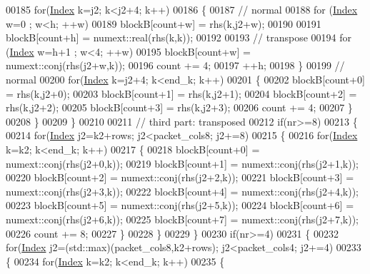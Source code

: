 \begin{DoxyCode}
00185         \textcolor{keywordflow}{for}(\hyperlink{namespace_eigen_a62e77e0933482dafde8fe197d9a2cfde}{Index} k=j2; k<j2+4; k++)
00186         \{
00187           \textcolor{comment}{// normal}
00188           \textcolor{keywordflow}{for} (\hyperlink{namespace_eigen_a62e77e0933482dafde8fe197d9a2cfde}{Index} w=0 ; w<h; ++w)
00189             blockB[count+w] = rhs(k,j2+w);
00190 
00191           blockB[count+h] = numext::real(rhs(k,k));
00192 
00193           \textcolor{comment}{// transpose}
00194           \textcolor{keywordflow}{for} (\hyperlink{namespace_eigen_a62e77e0933482dafde8fe197d9a2cfde}{Index} w=h+1 ; w<4; ++w)
00195             blockB[count+w] = numext::conj(rhs(j2+w,k));
00196           count += 4;
00197           ++h;
00198         \}
00199         \textcolor{comment}{// normal}
00200         \textcolor{keywordflow}{for}(\hyperlink{namespace_eigen_a62e77e0933482dafde8fe197d9a2cfde}{Index} k=j2+4; k<end\_k; k++)
00201         \{
00202           blockB[count+0] = rhs(k,j2+0);
00203           blockB[count+1] = rhs(k,j2+1);
00204           blockB[count+2] = rhs(k,j2+2);
00205           blockB[count+3] = rhs(k,j2+3);
00206           count += 4;
00207         \}
00208       \}
00209     \}
00210 
00211     \textcolor{comment}{// third part: transposed}
00212     \textcolor{keywordflow}{if}(nr>=8)
00213     \{
00214       \textcolor{keywordflow}{for}(\hyperlink{namespace_eigen_a62e77e0933482dafde8fe197d9a2cfde}{Index} j2=k2+rows; j2<packet\_cols8; j2+=8)
00215       \{
00216         \textcolor{keywordflow}{for}(\hyperlink{namespace_eigen_a62e77e0933482dafde8fe197d9a2cfde}{Index} k=k2; k<end\_k; k++)
00217         \{
00218           blockB[count+0] = numext::conj(rhs(j2+0,k));
00219           blockB[count+1] = numext::conj(rhs(j2+1,k));
00220           blockB[count+2] = numext::conj(rhs(j2+2,k));
00221           blockB[count+3] = numext::conj(rhs(j2+3,k));
00222           blockB[count+4] = numext::conj(rhs(j2+4,k));
00223           blockB[count+5] = numext::conj(rhs(j2+5,k));
00224           blockB[count+6] = numext::conj(rhs(j2+6,k));
00225           blockB[count+7] = numext::conj(rhs(j2+7,k));
00226           count += 8;
00227         \}
00228       \}
00229     \}
00230     \textcolor{keywordflow}{if}(nr>=4)
00231     \{
00232       \textcolor{keywordflow}{for}(\hyperlink{namespace_eigen_a62e77e0933482dafde8fe197d9a2cfde}{Index} j2=(std::max)(packet\_cols8,k2+rows); j2<packet\_cols4; j2+=4)
00233       \{
00234         \textcolor{keywordflow}{for}(\hyperlink{namespace_eigen_a62e77e0933482dafde8fe197d9a2cfde}{Index} k=k2; k<end\_k; k++)
00235         \{

\end{DoxyCode}
